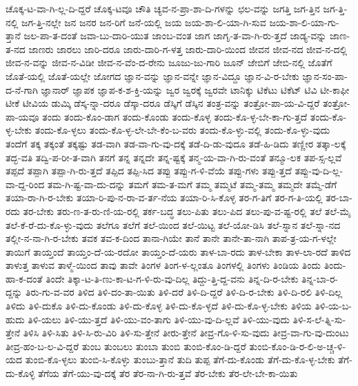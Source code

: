 {ಚೊಕ್ಕ-ಟ-ವಾ-ಗಿ-ಲ್ಲ-ದಿ-ದ್ದರೆ
ಚೊಕ್ಕ-ಟವೂ
ಚೌತಿ
ಚ್ಯವ-ನ-ಪ್ರಾ-ಶಾ-ದಿ-ಗಳನ್ನು
ಛಲ-ವನ್ನು
ಜಗತ್ತಿ
ಜಗ-ತ್ತಿನ
ಜಗ-ತ್ತಿ-ನಲ್ಲಿ
ಜಗ-ತ್ತಿ-ನಲ್ಲೇ
ಜನ
ಜನರ
ಜನ-ರಿಗೆ
ಜನೆ-ಯಲ್ಲಿ
ಜಯ
ಜಯ-ಶಾ-ಲಿ-ಯಾ-ಗಿ-ಸುವ
ಜಯ-ಶಾ-ಲಿ-ಯಾ-ಗು-ತ್ತಾನೆ
ಜಲ-ಪಾ-ತ-ದಂತೆ
ಜವಾ-ಬು-ದಾರಿ-ಯುತ
ಜಾಂಬ-ವಂತ
ಜಾಗ
ಜಾಗೃ-ತ-ವಾ-ಗಿ-ರು-ತ್ತದೆ
ಜಾಡ್ಯ-ವನ್ನು
ಜಾಣ-ತ-ನದ
ಜಾಣರು
ಜಾರಲು
ಜಾರಿ-ದರೂ
ಜಾರು-ದಾರಿ-ಗ-ಳತ್ತ
ಜಾರು-ದಾರಿ-ಯಿಂದ
ಜೀವನ
ಜೀವ-ನದ
ಜೀವ-ನ-ದಲ್ಲಿ
ಜೀವ-ನ-ವನ್ನು
ಜೀವ-ನ-ವಿಡೀ
ಜೀವ-ನ-ವೆಂ-ದ-ರೇನು
ಜೂಜು-ಜು-ಗಾರಿ
ಜೂನ್
ಜೇಬಿಗೆ
ಜೇಬಿ-ನಲ್ಲಿ
ಜೊತೆಗೆ
ಜೊತೆ-ಯಲ್ಲಿ
ಜೊತೆ-ಯಲ್ಲೇ
ಜೋಗದ
ಜ್ಞಾನ-ವನ್ನು
ಜ್ಞಾನ-ವನ್ನೇ
ಜ್ಞಾನ-ವಿದ್ದೂ
ಜ್ಞಾನ-ವಿ-ರ-ಬೇಕು
ಜ್ಞಾನ-ಸಂ-ಪಾ-ದ-ನೆ-ಗಾಗಿ
ಜ್ಞಾನಾರ್
ಜ್ಞಾಪಕ
ಜ್ಞಾಪ-ಕ-ಶ-ಕ್ತಿ-ಯನ್ನು
ಜ್ವರ
ಜ್ವರಕ್ಕೆ
ಜ್ವರವೇ
ಟಾನಿಕ್ಕು
ಟಿಕೆಟು
ಟಿಕೆಟ್
ಟಿವಿ
ಟೀ-ಕಾಫೀ
ಟೀಕೆ
ಟೀವಿಯ
ಡುಮ್ಕಿ
ಡೆಸ್ಕ-ನ್ನಾ-ದರೂ
ಡೆಸ್ಕಾ-ದರೂ
ಡೆಸ್ಕಿಗೆ
ಡೆಸ್ಕಿನ
ತಂತ್ರ-ವನ್ನು
ತಂತ್ರೋ-ಪಾ-ಯ-ವಿ-ದ್ದರೆ
ತಂತ್ರೋ-ಪಾ-ಯವೂ
ತಂದು
ತಂದು-ಕೊಂ-ಡಾಗ
ತಂದು-ಕೊಂಡು
ತಂದು-ಕೊಳ್ಳ
ತಂದು-ಕೊ-ಳ್ಳ-ಬೇ-ಕಾ-ಗು-ತ್ತದೆ
ತಂದು-ಕೊ-ಳ್ಳ-ಬೇಕು
ತಂದು-ಕೊ-ಳ್ಳಲು
ತಂದು-ಕೊ-ಳ್ಳ-ಲೇ-ಬೇ-ಕೆಂ-ಬ-ವರು
ತಂದು-ಕೊ-ಳ್ಳು-ವಲ್ಲಿ
ತಂದು-ಕೊ-ಳ್ಳು-ವುದು
ತಂದೆಗೆ
ತಕ್ಕ
ತಕ್ಕಂತೆ
ತಕ್ಕಷ್ಟು
ತಡ-ವಾಗಿ
ತಡ-ವಾ-ಗು-ವು-ದಕ್ಕೆ
ತಡೆ-ದಿ-ಡು-ವುದೂ
ತಡೆ-ಹಿ-ಡಿದು
ತಣ್ಣೀರ
ತತ್ಕಾ-ಲಕ್ಕೆ
ತದ್ಭ-ವತಿ
ತದ್ವಿ-ಪ-ರೀ-ತ-ವಾಗಿ
ತನಗೆ
ತನ್ನ
ತನ್ನದೇ
ತನ್ನ-ಷ್ಟಕ್ಕೆ
ತನ್ಮ-ಯ-ವಾ-ಗಿ-ರು-ವಂತೆ
ತನ್ಮೂ-ಲಕ
ತಪ-ಸ್ಸ-ಲ್ಲವೆ
ತಪ್ಪದೆ
ತಪ್ಪಾಗಿ
ತಪ್ಪಾ-ಗಿ-ರು-ತ್ತದೆ
ತಪ್ಪಿದ
ತಪ್ಪಿ-ಸಿದ
ತಪ್ಪು
ತಪ್ಪು-ಗ-ಳಿ-ವೆಯೆ
ತಪ್ಪು-ಗಳು
ತಪ್ಪು-ತ್ತದೆ
ತಪ್ಪು-ವು-ದಿ-ಲ್ಲ-ವಾ-ದ್ದ-ರಿಂದ
ತಮ-ಗಿ-ಷ್ಟ-ವಾ-ದು-ದನ್ನು
ತಮಗೆ
ತಮ-ತ-ಮಗೆ
ತಮ್ಮ
ತಮ್ಮಟೆ
ತಮ್ಮ-ತಮ್ಮ
ತಮ್ಮದೇ
ತಮ್ಮೆ-ಡೆಗೆ
ತಯಾ-ರಾ-ಗಿ-ರ-ಬೇಕು
ತಯಾ-ರಿ-ಪು-ನ-ರಾ-ವ-ರ್ತ-ನೆಯ
ತಯಾ-ರಿ-ಸಿ-ಕೊಳ್ಳ
ತರ-ಗ-ತಿಗೆ
ತರ-ಗ-ತಿ-ಯಲ್ಲಿ
ತರ-ಬಾ-ರದು
ತರ-ಬೇಕು
ತರು-ಣ-ತ-ರು-ಣಿ-ಯ-ರಲ್ಲಿ
ತರ್ಕ-ಬದ್ಧ
ತಲು-ಪಿತು
ತಲು-ಪಿದ
ತಲು-ಪು-ವ-ಷ್ಟ-ರಲ್ಲಿ
ತಲೆ
ತಲೆ-ಮೈ
ತಲೆ-ಕೆ-ರೆ-ದು-ಕೊ-ಳ್ಳು-ವುದು
ತಲೆಗೂ
ತಲೆಗೆ
ತಲೆ-ಯಿಂದ
ತಲೆ-ಯಿಟ್ಟ
ತಲೆ-ಯೋ-ಡಿಸಿ
ತಲೆ-ಸ್ನಾನ
ತಲೆ-ಸ್ನಾ-ನದ
ತಲ್ಲೀ-ನ-ನಾ-ಗಿ-ರ-ಬೇಕು
ತವಕ
ತವ-ಕ-ದಿಂದ
ತಾನಾ-ಗಿಯೇ
ತಾನೆ
ತಾನೇ
ತಾನೇ-ತಾ-ನಾಗಿ
ತಾಪ-ತ್ರ-ಯ-ಗ-ಳಲ್ಲೇ
ತಾಯಿಗೆ
ತಾಯ್ತಂದೆ
ತಾಯ್ತಂ-ದೆ-ಯ-ರದೋ
ತಾಯ್ತಂ-ದೆ-ಯರು
ತಾಳ-ಬಾ-ರದು
ತಾಳ-ಬೇಕಾ
ತಾಳ-ಲಾ-ರದೆ
ತಾಳಿದ
ತಾಳುತ್ತ
ತಾಳುವ
ತಾಳ್ಮೆ-ಯಿಂದ
ತಾವು
ತಾವೇ
ತಿಂಗಳ
ತಿಂಗ-ಳ-ಲ್ಲಂತೂ
ತಿಂಗಳಲ್ಲಿ
ತಿಂಗಳು
ತಿಂಡಿಯ
ತಿಂದು
ತಿಂದು-ಹಾ-ಕ-ದಂತೆ
ತಿಂದೇ
ತಿಕ್ಕಾ-ಟ-ತಿ-ಣು-ಕಾ-ಟ-ಗ-ಳಿ-ರು-ವು-ದಿಲ್ಲ
ತಿದ್ದು-ತ್ತಿ-ದ್ದ-ವನು
ತಿನ್ನ-ದಿ-ರ-ಬೇಕು
ತಿನ್ನ-ಬಾ-ರ-ದ್ದನ್ನು
ತಿರು-ಗು-ವ-ವರ
ತಿಳಿದ
ತಿಳಿ-ದಂ-ತಾ-ಯಿತು
ತಿಳಿ-ದರೆ
ತಿಳಿ-ದಿ-ದ್ದರೆ
ತಿಳಿ-ದಿ-ರ-ಬೇಕು
ತಿಳಿ-ದಿ-ರಲಿ
ತಿಳಿ-ದಿಲ್ಲ
ತಿಳಿದು
ತಿಳಿ-ದುಕೊ
ತಿಳಿ-ದು-ಕೊಂಡು
ತಿಳಿ-ದು-ಕೊಳ್ಳ
ತಿಳಿ-ದು-ಕೊ-ಳ್ಳದೆ
ತಿಳಿ-ದು-ಕೊ-ಳ್ಳ-ಬೇಕು
ತಿಳಿಯ
ತಿಳಿ-ಯ-ಬ-ಹುದು
ತಿಳಿ-ಯಲು
ತಿಳಿ-ಯು-ತ್ತದೆ
ತಿಳಿ-ಯು-ವಂ-ತಾಗು
ತಿಳಿ-ಯು-ವು-ದಿ-ಲ್ಲವೆ
ತಿಳಿ-ಯು-ವುದು
ತಿಳಿ-ಸ-ಲೆ-ತ್ನಿ-ಸು-ತ್ತೇನೆ
ತಿಳಿಸಿ
ತಿಳಿ-ಸಿತು
ತಿಳಿ-ಸಿ-ರು-ವಿರಿ
ತಿಳಿ-ಸು-ತ್ತೇನೆ
ತೀರು-ತ್ತೇನೆ
ತೀವ್ರ-ಗೊ-ಳಿ-ಸು-ವುದು
ತೀವ್ರ-ವಾ-ಗು-ವು-ದುಂಟು
ತೀವ್ರ-ಹಂ-ಬ-ಲ-ವಿ-ದ್ದರೆ
ತುಂಬ
ತುಂಬಲು
ತುಂಬಾ
ತುಂಬಿ
ತುಂಬಿ-ಕೊಂ-ಡಿ-ದ್ದರೆ
ತುಂಬಿ-ಕೊಂ-ಡಿ-ರ-ಲಿ-ಅ-ಚ್ಚ-ಳಿ-ಯದ
ತುಂಬಿ-ಕೊ-ಳ್ಳಲು
ತುಂಬಿ-ಸಿ-ಕೊಳ್ಳು
ತುಂಬು-ತ್ತಾನೆ
ತುದಿ
ತುಪ್ಪ
ತೆಗೆ-ದು-ಕೊಂಡು
ತೆಗೆ-ದು-ಕೊ-ಳ್ಳ-ಬೇಕು
ತೆಗೆ-ದು-ಕೊಳ್ಳಿ
ತೆಗೆಯ
ತೆಗೆ-ಯು-ವು-ದಕ್ಕೆ
ತೆರ
ತೆರ-ನಾ-ಗಿ-ರು-ತ್ತವೆ
ತೆರ-ಬೇಕು
ತೆರ-ಲೇ-ಬೇ-ಕಾ-ಯಿತು
}
